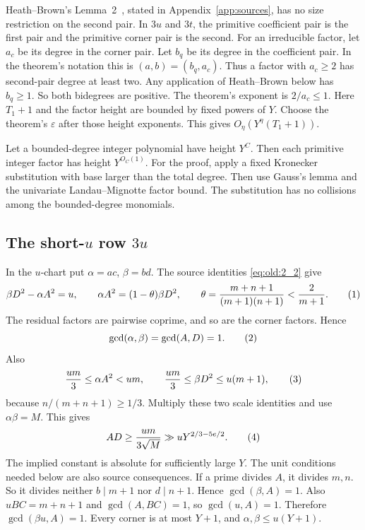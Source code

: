 Heath--Brown's Lemma~2~\cite[Lemma~2, p.~8]{HB2012}, stated in
Appendix~\ref{app:sources}, has no size restriction on the second pair.
In \(3u\) and \(3t\), the
primitive coefficient pair is the first pair and the primitive corner
pair is the second. For an irreducible factor, let \(a_c\) be its
degree in the corner pair. Let \(b_q\) be its degree in the coefficient
pair. In the theorem's notation this is \((a,b)=(b_q,a_c)\). Thus a
factor with \(a_c\ge2\) has second-pair degree at least two.
Any application of Heath--Brown below has \(b_q\ge1\). So both
bidegrees are positive. The theorem's exponent is \(2/a_c\le1\). Here
\(T_1+1\) and the factor height are bounded by fixed
powers of \(Y\). Choose the theorem's \(\varepsilon\) after those height
exponents. This gives \(O_\eta(Y^\eta(T_1+1))\).

Let a bounded-degree integer polynomial have height \(Y^C\). Then each
primitive integer factor has height \(Y^{O_C(1)}\). For the proof, apply
a fixed Kronecker substitution with base larger than the total degree.
Then use Gauss's lemma and the univariate Landau--Mignotte factor bound. The
substitution has no collisions among the bounded-degree monomials.

\subsection*{The short-\(u\) row \(3u\)}

In the \(u\)-chart put \(\alpha=ac\), \(\beta=bd\). The source identities
\eqref{eq:old:2_2} give
\[
 \beta D^2-\alpha A^2=u,\qquad
 \alpha A^2=(1-\theta)\beta D^2,\qquad
 \theta=\frac{m+n+1}{(m+1)(n+1)}<\frac2{m+1}.
\AutoTag{eq:old:5_15}
\]
The residual factors are pairwise coprime, and so are the corner
factors. Hence
\[
 \gcd(\alpha,\beta)=\gcd(A,D)=1.
\AutoTag{eq:old:5_16}
\]
Also
\[
 \frac{um}{3}\le\alpha A^2<um,\qquad
 \frac{um}{3}\le\beta D^2\le u(m+1),
\AutoTag{eq:old:5_17}
\]
because \(n/(m+n+1)\ge1/3\). Multiply these two scale identities
and use \(\alpha\beta=M\). This gives
\[
 AD\ge \frac{um}{3\sqrt M}
 \gg uY^{2/3-5e/2}.
\AutoTag{eq:old:5_18}
\]
The implied constant is absolute for sufficiently large \(Y\). The unit
conditions needed below are also source consequences. If a prime divides
\(A\), it divides \(m,n\). So it divides neither \(b\mid m+1\) nor
\(d\mid n+1\). Hence \(\gcd(\beta,A)=1\). Also \(uBC=m+n+1\) and
\(\gcd(A,BC)=1\), so \(\gcd(u,A)=1\). Therefore
\(\gcd(\beta u,A)=1\). Every corner is at most \(Y+1\), and
\(\alpha,\beta\le u(Y+1)\).

